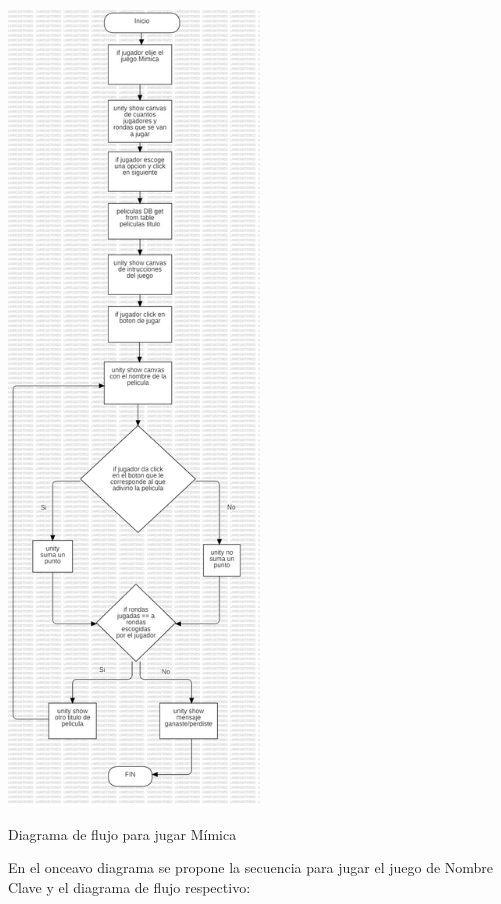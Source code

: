 \documentclass[12pt, oneside, letterpaper]{book}
\begin{document}
\begin{center}
	\centering
		\includegraphics[width=0.5\textwidth]{DFFNMimica.jpg}

	\caption{Diagrama de flujo para jugar Mímica}
	\label{DFFNMimica}
\end{center}
\bigskip
\fontsize{14}{18}\selectfont
\par 
En el onceavo diagrama se propone la secuencia para jugar el juego de Nombre Clave y el diagrama de flujo respectivo:
\end{document}
